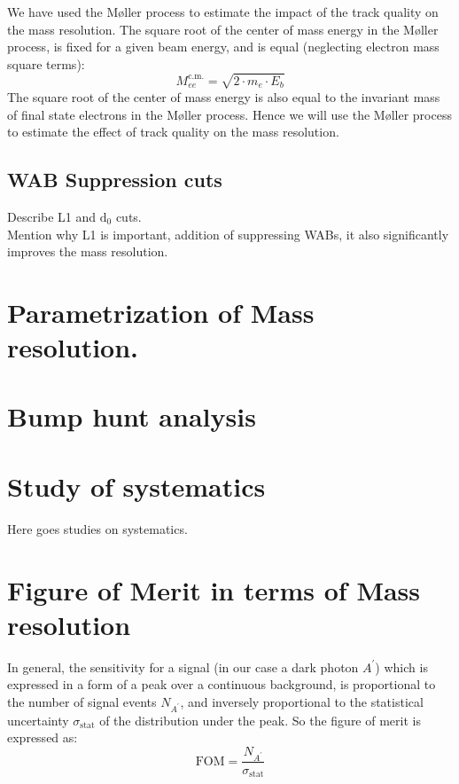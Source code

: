 \documentclass[letterpaper,12pt]{article}
\def \dstl {\displaystyle}
\def \Mlr {M\o ller }
\begin{document}
We have used the \Mlr process to estimate the impact of the track quality on the mass resolution. The square root of the center of mass energy in the \Mlr process, is fixed for a given beam energy, and is equal (neglecting electron mass square terms):
\begin{equation}
 \dstl M_{ee}^{\mathrm{c.m.}} = \sqrt{2\cdot m_{e}\cdot E_{b}}
\end{equation}
The square root of the center of mass energy is also equal to the invariant mass of final state electrons in the \Mlr process. Hence we will use the \Mlr process to estimate the effect of track quality on the mass resolution.


\subsection{WAB Suppression cuts}
Describe L1 and $\mathrm{d_{0}}$ cuts. \\
Mention why L1 is important, addition of suppressing WABs, it also significantly
improves the mass resolution.


\section{Parametrization of Mass resolution.}

\section{Bump hunt analysis}


\section{Study of systematics}
Here goes studies on systematics.




\appendix
\appendixpage
\addappheadtotoc
\section{Figure of Merit in terms of Mass resolution}
\label{sec:AppendixFOM}
In general, the sensitivity for a signal (in our case a dark photon $A^{\prime}$) which is expressed in a form of a peak over a continuous background, is proportional to the number of signal events $\dstl N_{A^{\prime}}$, and inversely proportional to the statistical uncertainty $\sigma_{\mathrm{stat}}$ of the distribution under the peak.
So the figure of merit is expressed as:
\begin{equation}
 \mathrm{FOM} = \frac{\dstl N_{A^{\prime}}}{\dstl \sigma_{\mathrm{stat}}}
 \label{eq:FOM_massres}
\end{equation}
\end{document}

